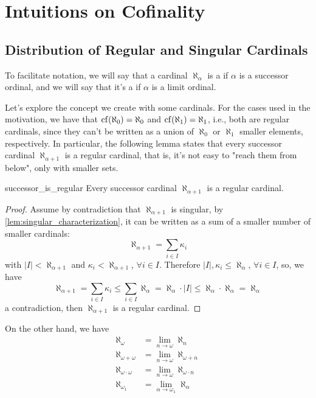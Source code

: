 \chapter{Intuitions on Cofinality}

\section{Distribution of Regular and Singular Cardinals}

To facilitate notation, we will say that a cardinal $\aleph_\alpha$ is a  if $\alpha$ is a successor ordinal, and we will say that it's a  if $\alpha$ is a limit ordinal.

Let's explore the concept we create with some cardinals. For the cases used in the motivation, we have that $\mathrm{cf}\!\left(\aleph_0\right)=\aleph_0$ and $\mathrm{cf}\!\left(\aleph_1\right)=\aleph_1$, i.e., both are regular cardinals, since they can't be written as a union of $\aleph_0$ or $\aleph_1$ smaller elements, respectively. In particular, the following lemma states that every successor cardinal $\aleph_{\alpha+1}$ is a regular cardinal, that is, it's not easy to "reach them from below", only with smaller sets.

\begin{lemma}{}{successor_is_regular}
    Every successor cardinal $\aleph_{\alpha+1}$ is a regular cardinal.
\end{lemma}

\begin{proof}
    Assume by contradiction that $\aleph_{\alpha+1}$ is singular, by \cref{lem:singular_characterization}, it can be written as a sum of a smaller number of smaller cardinals:
    $$\aleph_{\alpha+1}=\sum_{i\in I}\kappa_i$$
    with $|I|<\aleph_{\alpha+1}$ and $\kappa_i<\aleph_{\alpha+1}$, $\forall i\in I$. Therefore $|I|,\kappa_i\leq\aleph_\alpha$, $\forall i\in I$, so, we have
    $$\aleph_{\alpha+1}=\sum_{i\in I}\kappa_i\leq\sum_{i\in I}\aleph_\alpha=\aleph_{\alpha}\cdot|I|\leq\aleph_\alpha\cdot\aleph_\alpha=\aleph_\alpha$$
    a contradiction, then $\aleph_{\alpha+1}$ is a regular cardinal.
\end{proof}

On the other hand, we have
\begin{align*}
\aleph_\omega & = \lim_{n\to\omega}\aleph_n\\
\aleph_{\omega+\omega} & = \lim_{n\to\omega}\aleph_{\omega+n}\\
\aleph_{\omega\cdot\omega} & = \lim_{n\to\omega}\aleph_{\omega\cdot n}\\
\aleph_{\omega_1} & = \lim_{\alpha\to\omega_1}\aleph_\alpha
\end{align*}

